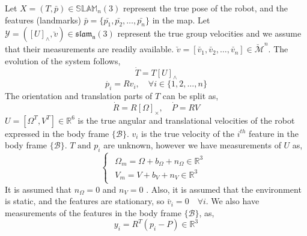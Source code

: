 \documentclass[12pt]{article}
\def\omani#1{\breve{#1}}
\begin{document}
Let $X = (T, \bar{p}) \in \mathbb{SLAM}_n(3) $ represent the true pose of the robot, and the features (landmarks) $\bar{p} = \{\bar{p_1}, \bar{p_2}, \ldots, \bar{p_n}\}$ in the map.
Let $\mathcal{Y} = ([U]_\wedge, \omani{v}) \in \mathfrak{slam_n} (3) $ represent
the true group velocities and we assume that their measurements are readily available. 
$\omani{v} = [\omani{v_1}, \omani{v_2}, \dots ,\omani{v_n}] \in \breve{\mathcal{M}}^n$. 
The evolution of the system follows,
\begin{equation}\label{eq:slam_dynamics}
    \dot{T} = T [U]_\wedge
\end{equation}
\begin{equation}
    \dot{p_i} = R v_i, \quad \forall  i \in \{1, 2, \ldots, n\}
\end{equation}
The orientation and translation parts of $T$ can be split as,
\begin{equation}
    \dot{R} = R [\Omega]_\times, \quad \dot{P} = RV
\end{equation}
$U = [\Omega^T, V^T] \in \mathbb{R}^6 $ is the true angular and translational velocities
of the robot expressed in the body frame $\{\mathcal{B}\}$. $v_i$ is the true velocity of the $i^{th}$ feature in the body frame $\{\mathcal{B}\}$.
$T \text{ and } p_i$ are unknown, however we have measurements of $U$ as, 
\begin{equation}
    \begin{cases}
        \begin{array}{rcl}
            \Omega_m = \Omega + b_{\Omega} + n_{\Omega} \in \mathbb{R}^3 \\
            V_m = V + b_V + n_V \in \mathbb{R}^3
        \end{array}\
    \end{cases}
\end{equation}
It is assumed that $n_{\Omega} = 0$ and $n_V = 0$ . Also, it is assumed that the 
environment is static, and the features are stationary, so $\omani{v_i} = 0 \quad \forall i$. 
We also have measurements of the features in the body frame $\{\mathcal{B}\}$, as,
\begin{equation}
    y_i = R^T(p_i - P) \in \mathbb{R}^3
\end{equation}
\end{document}
